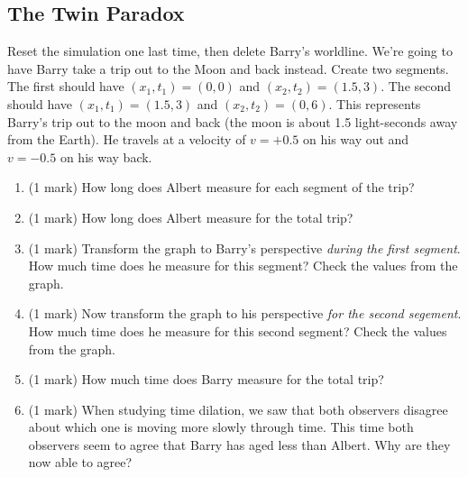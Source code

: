 \documentclass{article}
\begin{document}
\subsection*{The Twin Paradox}

Reset the simulation one last time, then delete Barry's worldline. We're going to have Barry take a trip out to the Moon and back instead. Create two segments. The first should have $(x_1,t_1)=(0,0)$ and $(x_2,t_2)=(1.5,3)$. The second should have $(x_1,t_1)=(1.5,3)$ and $(x_2,t_2)=(0,6)$. This represents Barry's trip out to the moon and back (the moon is about 1.5 light-seconds away from the Earth). He travels at a velocity of $v=+0.5$ on his way out and $v=-0.5$ on his way back.

\begin{enumerate}
\item (1 mark) How long does Albert measure for each segment of the trip?
\vspace{2cm}
\item (1 mark) How long does Albert measure for the total trip?
\vspace{2cm}
\item (1 mark) Transform the graph to Barry's perspective \textit{during the first segment}. How much time does he measure for this segment? Check the values from the graph.
\vspace{2cm}
\item (1 mark) Now transform the graph to his perspective \textit{for the second segement}. How much time does he measure for this second segment? Check the values from the graph.
\vspace{2cm}
\item (1 mark) How much time does Barry measure for the total trip?
\vspace{2cm}
\item (1 mark) When studying time dilation, we saw that both observers disagree about which one is moving more slowly through time. This time both observers seem to agree that Barry has aged less than Albert. Why are they now able to agree?
\vspace{6cm}
\end{enumerate}




\end{document}
